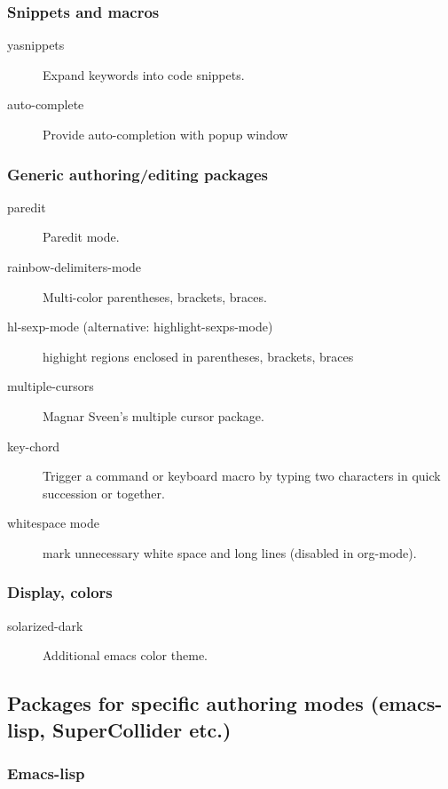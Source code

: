 \documentclass{article}
\begin{document}
\subsubsection{Snippets and macros}
\label{sec-1-1-4}

\begin{description}
\item[{yasnippets}] Expand keywords into code snippets.
\item[{auto-complete}] Provide auto-completion with popup window
\end{description}

\subsubsection{Generic authoring/editing packages}
\label{sec-1-1-5}

\begin{description}
\item[{paredit}] Paredit mode.
\item[{rainbow-delimiters-mode}] Multi-color parentheses, brackets, braces.
\item[{hl-sexp-mode (alternative: highlight-sexps-mode)}] highight regions enclosed in parentheses, brackets, braces
\item[{multiple-cursors}] Magnar Sveen's multiple cursor package.
\item[{key-chord}] Trigger a command or keyboard macro by typing two characters in quick succession or together.
\item[{whitespace mode}] mark unnecessary white space and long lines (disabled in org-mode).
\end{description}

\subsubsection{Display, colors}
\label{sec-1-1-6}

\begin{description}
\item[{solarized-dark}] Additional emacs color theme.
\end{description}

\subsection{Packages for specific authoring modes (emacs-lisp, SuperCollider etc.)}
\label{sec-1-2}

\subsubsection{Emacs-lisp}
\label{sec-1-2-1}
\end{document}

